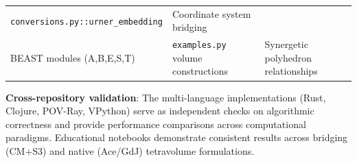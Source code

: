 \documentclass[
]{article}
\begin{document}
\begin{longtable}[]{@{}lll@{}}
\begin{minipage}[t]{0.35\columnwidth}
\texttt{conversions.py::urner\_embedding}\strut
\end{minipage} & \begin{minipage}[t]{0.26\columnwidth}\raggedright
Coordinate system bridging\strut
\end{minipage}\tabularnewline
\begin{minipage}[t]{0.30\columnwidth}\raggedright
BEAST modules (A,B,E,S,T)\strut
\end{minipage} & \begin{minipage}[t]{0.35\columnwidth}\raggedright
\texttt{examples.py} volume constructions\strut
\end{minipage} & \begin{minipage}[t]{0.26\columnwidth}\raggedright
Synergetic polyhedron relationships\strut
\end{minipage}\tabularnewline
\bottomrule
\end{longtable}

\textbf{Cross-repository validation}: The multi-language implementations
(Rust, Clojure, POV-Ray, VPython) serve as independent checks on
algorithmic correctness and provide performance comparisons across
computational paradigms. Educational notebooks demonstrate consistent
results across bridging (CM+S3) and native (Ace/GdJ) tetravolume
formulations.
\end{document}
